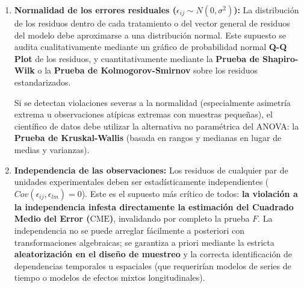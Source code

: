 \begin{enumerate}
	\item \textbf{Normalidad de los errores residuales ($\epsilon_{ij} \sim N(0,\sigma^2)$):} La distribución de los residuos dentro de cada tratamiento o del vector general de residuos del modelo debe aproximarse a una distribución normal. Este supuesto se audita cualitativamente mediante un gráfico de probabilidad normal \textbf{Q-Q Plot} de los residuos, y cuantitativamente mediante la \textbf{Prueba de Shapiro-Wilk} o la \textbf{Prueba de Kolmogorov-Smirnov} sobre los residuos estandarizados.

	Si se detectan violaciones severas a la normalidad (especialmente asimetría extrema u observaciones atípicas extremas con muestras pequeñas), el científico de datos debe utilizar la alternativa no paramétrica del ANOVA: la \textbf{Prueba de Kruskal-Wallis} (basada en rangos y medianas en lugar de medias y varianzas).

	\item \textbf{Independencia de las observaciones:} Los residuos de cualquier par de unidades experimentales deben ser estadísticamente independientes ($Cov(\epsilon_{ij}, \epsilon_{lm}) = 0$). Este es el supuesto más crítico de todos: \textbf{la violación a la independencia infesta directamente la estimación del Cuadrado Medio del Error ($\text{CME}$)}, invalidando por completo la prueba $F$. La independencia no se puede arreglar fácilmente a posteriori con transformaciones algebraicas; se garantiza a priori mediante la estricta \textbf{aleatorización en el diseño de muestreo} y la correcta identificación de dependencias temporales u espaciales (que requerirían modelos de series de tiempo o modelos de efectos mixtos longitudinales).
\end{enumerate}

